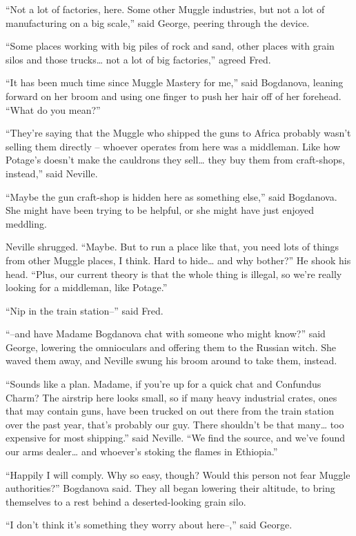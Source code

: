 ``Not a lot of factories, here. Some other Muggle industries, but not a
lot of manufacturing on a big scale,'' said George, peering through the
device.

``Some places working with big piles of rock and sand, other places with
grain silos and those trucks\ldots{} not a lot of big factories,''
agreed Fred.

``It has been much time since Muggle Mastery for me,'' said Bogdanova,
leaning forward on her broom and using one finger to push her hair off
of her forehead. ``What do you mean?''

``They're saying that the Muggle who shipped the guns to Africa probably
wasn't selling them directly -- whoever operates from here was a
middleman. Like how Potage's doesn't make the cauldrons they
sell\ldots{} they buy them from craft-shops, instead,'' said Neville.

``Maybe the gun craft-shop is hidden here as something else,'' said
Bogdanova. She might have been trying to be helpful, or she might have
just enjoyed meddling.

Neville shrugged. ``Maybe. But to run a place like that, you need lots
of things from other Muggle places, I think. Hard to hide\ldots{} and
why bother?'' He shook his head. ``Plus, our current theory is that the
whole thing is illegal, so we're really looking for a middleman, like
Potage.''

``Nip in the train station--'' said Fred.

``--and have Madame Bogdanova chat with someone who might know?'' said
George, lowering the omnioculars and offering them to the Russian witch.
She waved them away, and Neville swung his broom around to take them,
instead.

``Sounds like a plan. Madame, if you're up for a quick chat and
Confundus Charm? The airstrip here looks small, so if many heavy
industrial crates, ones that may contain guns, have been trucked on out
there from the train station over the past year, that's probably our
guy. There shouldn't be that many\ldots{} too expensive for most
shipping.'' said Neville. ``We find the source, and we've found our arms
dealer\ldots{} and whoever's stoking the flames in Ethiopia.''

``Happily I will comply. Why so easy, though? Would this person not fear
Muggle authorities?'' Bogdanova said. They all began lowering their
altitude, to bring themselves to a rest behind a deserted-looking grain
silo.

``I don't think it's something they worry about here--,'' said George.

